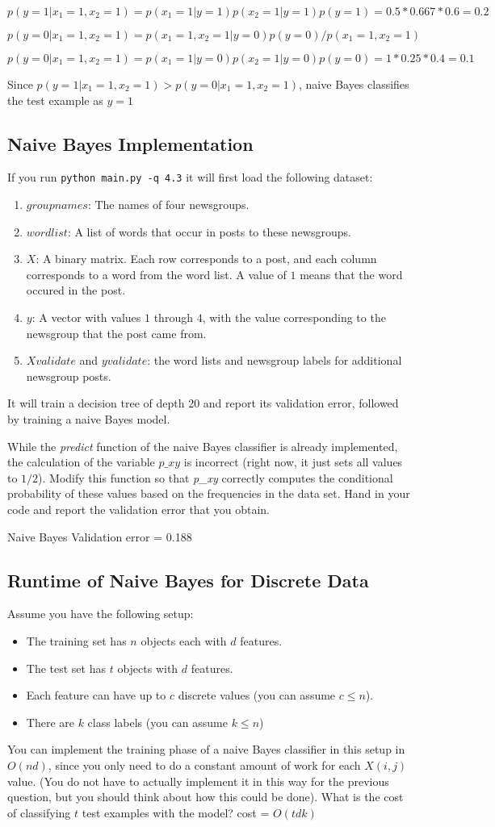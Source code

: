 \documentclass{article}
\def\blu#1{{\color{blu}#1}}
\def\items#1{\begin{itemize}#1\end{itemize}}
\def\enum#1{\begin{enumerate}#1\end{enumerate}}
\begin{document}
$p(y=1|x_1=1, x_2=1) = p(x_1=1|y=1)p(x_2=1|y=1)p(y=1) = 0.5*0.667*0.6 = 0.2$


$p(y=0|x_1=1, x_2=1) = p(x_1=1, x_2=1|y=0)p(y=0)/p(x_1=1, x_2=1)$

$p(y=0|x_1=1, x_2=1) = p(x_1=1|y=0)p(x_2=1|y=0)p(y=0) = 1*0.25*0.4 = 0.1$

Since $p(y=1|x_1=1, x_2=1) > p(y=0|x_1=1, x_2=1)$, naive Bayes classifies the test example as $y=1$

\subsection{Naive Bayes Implementation}

If you run \texttt{python main.py \string-q 4.3} it will first load the following dataset:
\enum{
\item $groupnames$: The names of four newsgroups.
\item $wordlist$: A list of words that occur in posts to these newsgroups.
\item $X$: A binary matrix. Each row corresponds to a post, and each column corresponds to a word from the word list. A value of $1$ means that the word occured in the post.
\item $y$: A vector with values $1$ through $4$, with the value corresponding to the newsgroup that the post came from.
\item $Xvalidate$ and $yvalidate$: the word lists and newsgroup labels for additional newsgroup posts.
}
It will train a decision tree of depth 20 and report its validation error, followed by training a naive Bayes model.

While the \emph{predict} function of the naive Bayes classifier is already implemented, the calculation of the variable $p\_xy$ is incorrect (right now, it just sets all values to $1/2$). \blu{Modify this function so that \emph{p\_xy} correctly computes the conditional probability of these values based on the frequencies in the data set. Hand in your code and report the validation error that you obtain.}

Naive Bayes Validation error = 0.188

\subsection{Runtime of Naive Bayes for Discrete Data}

Assume you have the following setup:
\items{
\item The training set has $n$ objects each with $d$ features.
\item The test set has $t$ objects with $d$ features.
\item Each feature can have up to $c$ discrete values (you can assume $c \leq n$).
\item There are $k$ class labels (you can assume $k \leq n$)
}
You can implement the training phase of a naive Bayes classifier in this setup in $O(nd)$, since you only need to do a constant amount of work for each $X(i,j)$ value. (You do not have to actually implement it in this way for the previous question, but you should think about how this could be done). \blu{What is the cost of classifying $t$ test examples with the model?}
cost = $O(tdk)$

\end{document}
